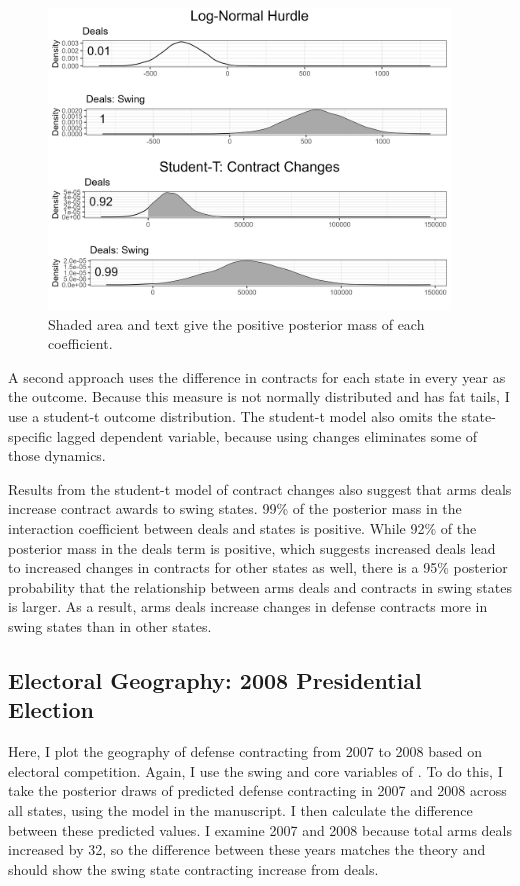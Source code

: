 \documentclass[12pt]{article}
\begin{document}
\begin{figure}[htpb]
	\centering
		\includegraphics[width=0.95\textwidth]{me-deals-check.png}
	\caption{Shaded area and text give the positive posterior mass of each coefficient.}
	\label{fig:me-deals-check}
\end{figure}


A second approach uses the difference in contracts for each state in every year as the outcome. 
Because this measure is not normally distributed and has fat tails, I use a student-t outcome distribution.
The student-t model also omits the state-specific lagged dependent variable, because using changes eliminates some of those dynamics. 


Results from the student-t model of contract changes also suggest that arms deals increase contract awards to swing states. 
99\% of the posterior mass in the interaction coefficient between deals and states is positive.
While 92\% of the posterior mass in the deals term is positive, which suggests increased deals lead to increased changes in contracts for other states as well, there is a 95\% posterior probability that the relationship between arms deals and contracts in swing states is larger. 
As a result, arms deals increase changes in defense contracts more in swing states than in other states. 


\subsection{Electoral Geography: 2008 Presidential Election}

Here, I plot the geography of defense contracting from 2007 to 2008 based on electoral competition.
Again, I use the swing and core variables of \citet{KrinerReeves2015}. 
To do this, I take the posterior draws of predicted defense contracting in 2007 and 2008 across all states, using the model in the manuscript. 
I then calculate the difference between these predicted values. 
I examine 2007 and 2008 because total arms deals increased by 32, so the difference between these years matches the theory and should show the swing state contracting increase from deals. 
\end{document}
